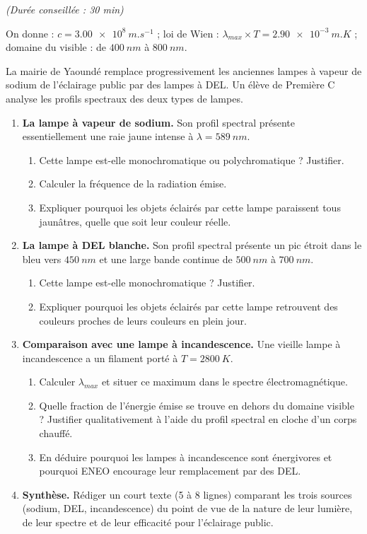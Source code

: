 \documentclass[11pt]{article}
\begin{document}
\begin{exercice}
\textit{(Durée conseillée : 30 min)}

On donne : $c = \SI{3,00e8}{m.s^{-1}}$ ; loi de Wien : $\lambda_{max} \times T = \SI{2,90e-3}{m.K}$ ; domaine du visible : de $\SI{400}{nm}$ à $\SI{800}{nm}$.

La mairie de Yaoundé remplace progressivement les anciennes lampes à vapeur de sodium de l'éclairage public par des lampes à DEL. Un élève de Première C analyse les profils spectraux des deux types de lampes.

\begin{enumerate}
\item \textbf{La lampe à vapeur de sodium.} Son profil spectral présente essentiellement une raie jaune intense à $\lambda = \SI{589}{nm}$.
\begin{enumerate}
\item Cette lampe est-elle monochromatique ou polychromatique ? Justifier.
\item Calculer la fréquence de la radiation émise.
\item Expliquer pourquoi les objets éclairés par cette lampe paraissent tous jaunâtres, quelle que soit leur couleur réelle.
\end{enumerate}
\item \textbf{La lampe à DEL blanche.} Son profil spectral présente un pic étroit dans le bleu vers $\SI{450}{nm}$ et une large bande continue de $\SI{500}{nm}$ à $\SI{700}{nm}$.
\begin{enumerate}
\item Cette lampe est-elle monochromatique ? Justifier.
\item Expliquer pourquoi les objets éclairés par cette lampe retrouvent des couleurs proches de leurs couleurs en plein jour.
\end{enumerate}
\item \textbf{Comparaison avec une lampe à incandescence.} Une vieille lampe à incandescence a un filament porté à $T = \SI{2800}{K}$.
\begin{enumerate}
\item Calculer $\lambda_{max}$ et situer ce maximum dans le spectre électromagnétique.
\item Quelle fraction de l'énergie émise se trouve en dehors du domaine visible ? Justifier qualitativement à l'aide du profil spectral en cloche d'un corps chauffé.
\item En déduire pourquoi les lampes à incandescence sont énergivores et pourquoi ENEO encourage leur remplacement par des DEL.
\end{enumerate}
\item \textbf{Synthèse.} Rédiger un court texte (5 à 8 lignes) comparant les trois sources (sodium, DEL, incandescence) du point de vue de la nature de leur lumière, de leur spectre et de leur efficacité pour l'éclairage public.
\end{enumerate}
\end{exercice}
\end{document}
